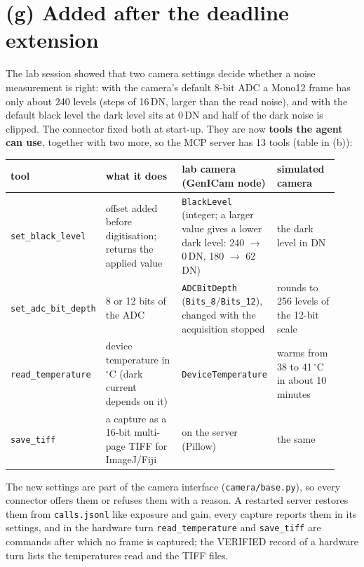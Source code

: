 \section*{(g) Added after the deadline extension}
The lab session showed that two camera settings decide whether a noise measurement is right: with the camera's default
8-bit ADC a Mono12 frame has only about 240 levels (steps of 16\,DN, larger than the read noise), and with the default
black level the dark level sits at 0\,DN and half of the dark noise is clipped. The connector fixed both at start-up.
They are now \textbf{tools the agent can use}, together with two more, so the MCP server has 13 tools (table in (b)):

\begin{center}\small
\begin{tabular}{@{}p{0.2\linewidth}p{0.26\linewidth}p{0.27\linewidth}p{0.2\linewidth}@{}}
\toprule
tool & what it does & lab camera (GenICam node) & simulated camera\\ \midrule
\texttt{set\_black\_level} & offset added before digitisation; returns the applied value &
  \texttt{BlackLevel} (integer; a larger value gives a lower dark level: 240 $\to$ 0\,DN, 180 $\to$ 62\,DN) &
  the dark level in DN\\
\texttt{set\_adc\_bit\_depth} & 8 or 12 bits of the ADC & \texttt{ADCBitDepth} (\texttt{Bits\_8}/\texttt{Bits\_12}),
  changed with the acquisition stopped & rounds to 256 levels of the 12-bit scale\\
\texttt{read\_temperature} & device temperature in $^\circ$C (dark current depends on it) & \texttt{DeviceTemperature} &
  warms from 38 to 41\,$^\circ$C in about 10 minutes\\
\texttt{save\_tiff} & a capture as a 16-bit multi-page TIFF for ImageJ/Fiji & on the server (Pillow) & the same\\
\bottomrule
\end{tabular}
\end{center}

The new settings are part of the camera interface (\texttt{camera/base.py}), so every connector offers them or refuses
them with a reason. A restarted server restores them from \texttt{calls.jsonl} like exposure and gain, every capture
reports them in its settings, and in the hardware turn \texttt{read\_temperature} and \texttt{save\_tiff} are commands
after which no frame is captured; the VERIFIED record of a hardware turn lists the temperatures read and the TIFF files.

